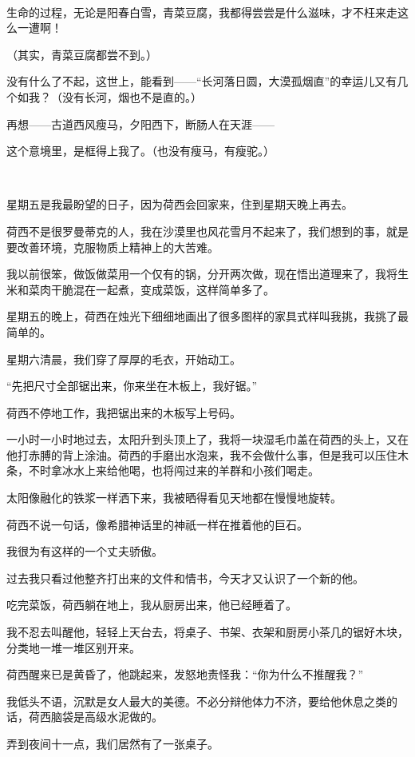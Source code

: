 \par  
\par 生命的过程，无论是阳春白雪，青菜豆腐，我都得尝尝是什么滋味，才不枉来走这么一遭啊！
\par （其实，青菜豆腐都尝不到。）
\par 没有什么了不起，这世上，能看到——“长河落日圆，大漠孤烟直”的幸运儿又有几个如我？（没有长河，烟也不是直的。）
\par 再想——古道西风瘦马，夕阳西下，断肠人在天涯——
\par 这个意境里，是框得上我了。（也没有瘦马，有瘦驼。）
\par  
\par 星期五是我最盼望的日子，因为荷西会回家来，住到星期天晚上再去。
\par 荷西不是很罗曼蒂克的人，我在沙漠里也风花雪月不起来了，我们想到的事，就是要改善环境，克服物质上精神上的大苦难。
\par 我以前很笨，做饭做菜用一个仅有的锅，分开两次做，现在悟出道理来了，我将生米和菜肉干脆混在一起煮，变成菜饭，这样简单多了。
\par 星期五的晚上，荷西在烛光下细细地画出了很多图样的家具式样叫我挑，我挑了最简单的。
\par 星期六清晨，我们穿了厚厚的毛衣，开始动工。
\par “先把尺寸全部锯出来，你来坐在木板上，我好锯。”
\par 荷西不停地工作，我把锯出来的木板写上号码。
\par 一小时一小时地过去，太阳升到头顶上了，我将一块湿毛巾盖在荷西的头上，又在他打赤膊的背上涂油。荷西的手磨出水泡来，我不会做什么事，但是我可以压住木条，不时拿冰水上来给他喝，也将闯过来的羊群和小孩们喝走。
\par 太阳像融化的铁浆一样洒下来，我被晒得看见天地都在慢慢地旋转。
\par 荷西不说一句话，像希腊神话里的神祇一样在推着他的巨石。
\par 我很为有这样的一个丈夫骄傲。
\par 过去我只看过他整齐打出来的文件和情书，今天才又认识了一个新的他。
\par 吃完菜饭，荷西躺在地上，我从厨房出来，他已经睡着了。
\par 我不忍去叫醒他，轻轻上天台去，将桌子、书架、衣架和厨房小茶几的锯好木块，分类地一堆一堆区别开来。
\par 荷西醒来已是黄昏了，他跳起来，发怒地责怪我：“你为什么不推醒我？”
\par 我低头不语，沉默是女人最大的美德。不必分辩他体力不济，要给他休息之类的话，荷西脑袋是高级水泥做的。
\par 弄到夜间十一点，我们居然有了一张桌子。
